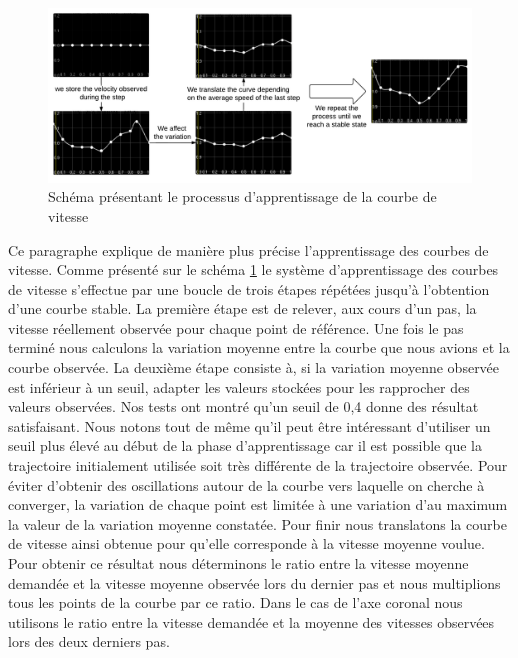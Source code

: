 \documentclass[runningheads,a4paper]{llncs}
\begin{document}
\vspace*{-0.5cm}
\begin{figure}[h]
\centering
\includegraphics[scale=0.45]{speed_curve_learner.pdf}
\caption{Schéma présentant le processus d'apprentissage de la courbe de vitesse}
\label{fig:speed_curve_learner}
\end{figure}


Ce paragraphe explique de manière plus précise l'apprentissage des courbes de vitesse. Comme présenté sur le schéma \ref{fig:speed_curve_learner} le système d'apprentissage des courbes de vitesse s'effectue par une boucle de trois étapes répétées jusqu'à l'obtention d'une courbe stable. La première étape est de relever, aux cours d'un pas, la vitesse réellement observée pour chaque point de référence. Une fois le pas terminé nous calculons la variation moyenne entre la courbe que nous avions et la courbe observée. La deuxième étape consiste à, si la variation moyenne observée est inférieur à un seuil, adapter les valeurs stockées pour les rapprocher des valeurs observées. Nos tests ont montré qu'un seuil de 0,4 donne des résultat satisfaisant. Nous notons tout de même qu'il peut être intéressant d'utiliser un seuil plus élevé au début de la phase d'apprentissage car il est possible que la trajectoire initialement utilisée soit très différente de la trajectoire observée.  Pour éviter d'obtenir des oscillations autour de la courbe vers laquelle on cherche à converger, la variation de chaque point est limitée à une variation d'au maximum la valeur de la variation moyenne constatée. Pour finir nous translatons la courbe de vitesse ainsi obtenue pour qu'elle corresponde à la vitesse moyenne voulue. Pour obtenir ce résultat nous déterminons le ratio entre la vitesse moyenne demandée et la vitesse moyenne observée lors du dernier pas et nous multiplions tous les points de la courbe par ce ratio. Dans le cas de l'axe coronal nous utilisons le ratio entre la vitesse demandée et la moyenne des vitesses observées lors des deux derniers pas.
\end{document}
